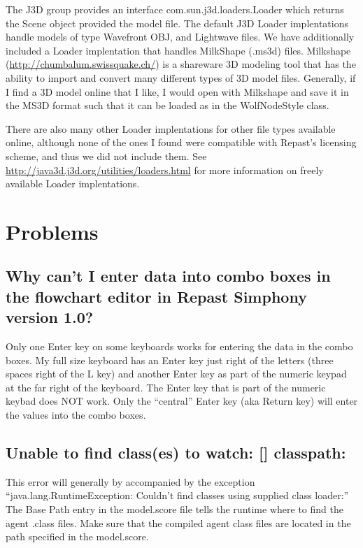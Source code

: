 \documentclass[11pt]{article}
\begin{document}
The J3D group provides an interface com.sun.j3d.loaders.Loader which returns the Scene object provided the model file. The default J3D Loader implentations handle models of type Wavefront OBJ, and Lightwave files. We have additionally included a Loader implentation that handles MilkShape (.ms3d) files. Milkshape (\url{http://chumbalum.swissquake.ch/}) is a shareware 3D modeling tool that has the ability to import and convert many different types of 3D model files. Generally, if I find a 3D model online that I like, I would open with Milkshape and save it in the MS3D format such that it can be loaded as in the WolfNodeStyle class.

There are also many other Loader implentations for other file types available online, although none of the ones I found were compatible with Repast's licensing scheme, and thus we did not include them. See \url{http://java3d.j3d.org/utilities/loaders.html} for more information on freely available Loader implentations.

\section{Problems}
\subsection{Why can't I enter data into combo boxes in the flowchart editor in Repast Simphony version 1.0?}
\label{p:combo}

Only one Enter key on some keyboards works for entering the data in the combo boxes. My full size keyboard has an Enter key just right of the letters (three spaces right of the L key) and another Enter key as part of the numeric keypad at the far right of the keyboard. The Enter key that is part of the numeric keybad does NOT work. Only the ``central'' Enter key (aka Return key) will enter the values into the combo boxes.

\subsection{Unable to find class(es) to watch: [] classpath:}
\label{p:classpath}
This error will generally by accompanied by the exception ``java.lang.RuntimeException: Couldn't find classes using supplied class loader:'' The Base Path entry in the model.score file tells the runtime where to find the agent .class files. Make sure that the compiled agent class files are located in the path specified in the model.score.
\end{document}
